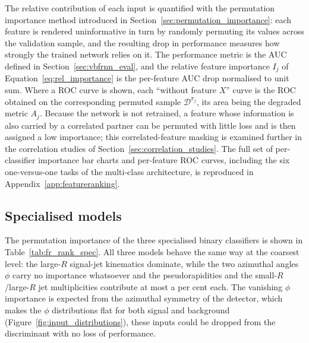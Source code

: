 The relative contribution of each input is quantified with the permutation importance method introduced in Section~\ref{sec:permutation_importance}: each feature is rendered uninformative in turn by randomly permuting its values across the validation sample, and the resulting drop in performance measures how strongly the trained network relies on it. The performance metric is the AUC defined in Section~\ref{sec:vbfrnn_eval}, and the relative feature importance $I_j$ of Equation~\ref{eq:rel_importance} is the per-feature AUC drop normalised to unit sum. Where a ROC curve is shown, each ``without feature $X$'' curve is the ROC obtained on the corresponding permuted sample $\mathcal{D}^{\pi_j}$, its area being the degraded metric $A_j$. Because the network is not retrained, a feature whose information is also carried by a correlated partner can be permuted with little loss and is then assigned a low importance; this correlated-feature masking is examined further in the correlation studies of Section~\ref{sec:correlation_studies}. The full set of per-classifier importance bar charts and per-feature ROC curves, including the six one-versus-one tasks of the multi-class architecture, is reproduced in Appendix~\ref{app:featureranking}.

\subsection{Specialised models}
\label{sec:fr_specialised}

The permutation importance of the three specialised binary classifiers is shown in Table~\ref{tab:fr_rank_spec}. All three models behave the same way at the coarsest level: the large-$R$ signal-jet kinematics dominate, while the two azimuthal angles $\phi$ carry no importance whatsoever and the pseudorapidities and the small-$R$/large-$R$ jet multiplicities contribute at most a per cent each. The vanishing $\phi$ importance is expected from the azimuthal symmetry of the detector, which makes the $\phi$ distributions flat for both signal and background (Figure~\ref{fig:input_distributions}), these inputs could be dropped from the discriminant with no loss of performance.

